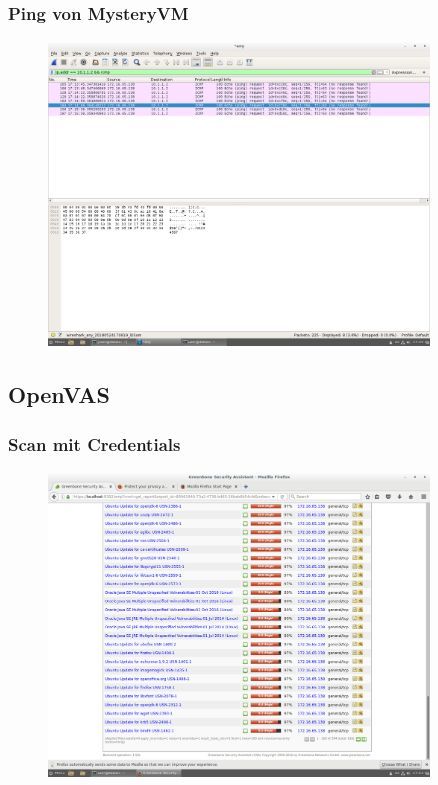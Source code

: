\documentclass[12pt]{article}
\theoremstyle{plain}
\begin{document}
\subsubsection*{Ping von MysteryVM}
\begin{figure}[!ht]
	\centering
     \includegraphics[width=0.9\textwidth]{Bilder/ping_von_mysteryVM.png}
\end{figure}
\newpage

\subsection*{OpenVAS}
\subsubsection*{Scan mit Credentials}
\begin{figure}[!ht]
	\centering
     \includegraphics[width=0.9\textwidth]{Bilder/openvas_with_credentials.png}
\end{figure}
\end{document}
